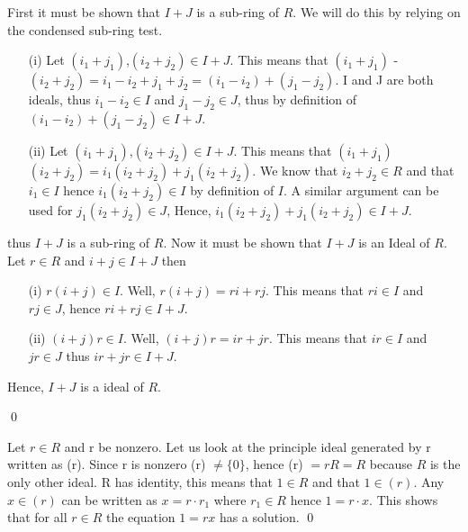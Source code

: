 \documentclass[11pt]{article}
\begin{document}

\affirmation


\proof
{
  First it must be shown that \(I+J\) is a sub-ring of \(R\). We will do this by relying on the condensed sub-ring test.
  \begin{itemize}
      \item[(i)] Let \((i_1 +j_1)\),\((i_2+j_2) \in I+J\). This means that \((i_1 +j_1)\) - \((i_2+j_2) = i_1 - i_2 + j_1 + j_2 = (i_1 - i_2) + (j_1 - j_2)\).
      I and J are both ideals, thus \(i_1 - i_2 \in I\) and \(j_1 - j_2 \in J\), thus by definition of \((i_1 - i_2) + (j_1 - j_2) \in I+J\).
      \item[(ii)] Let \((i_1 +j_1)\),\((i_2+j_2) \in I+J\). This means that \((i_1 +j_1)\)\((i_2+j_2) = i_1(i_2+j_2)+ j_1(i_2+j_2)\). We know that \(i_2+j_2 \in R\)  and that \(i_1 \in I\) hence \(i_1(i_2+j_2) \in I\) by definition of \(I\). A similar argument can be used for \(j_1(i_2+j_2) \in J\), Hence, \(i_1(i_2+j_2)+ j_1(i_2+j_2) \in I+J\).
  \end{itemize}
  thus \(I+J\) is a sub-ring of \(R.\) Now it must be shown that \(I + J\) is an Ideal of \(R\). Let \(r\in R\) and \(i+j \in I+J\) then
  \begin{itemize}
      \item[(i)]\(r(i+j) \in I\). Well, \(r(i+j) = ri + rj\). This means that \(ri \in I\) and \(rj \in J\), hence \(ri + rj \in I+J\).
      \item[(ii)]\((i+j)r \in I\). Well, \((i+j)r = ir + jr\). This means that \(ir \in I\) and \(jr \in J\) thus \(ir + jr \in I+J\).
  \end{itemize}
  Hence, \(I +J\) is a ideal of \(R\).
}

\qed


\proof
{
Let \(r \in R\) and r be nonzero. Let us look at the principle ideal generated by r written as (r). Since r is nonzero (r) \(\neq  \{0\}\), hence (r) \(= rR = R\) because \(R\) is the only other ideal. R has identity, this means that \(1 \in R\) and that \(1 \in (r)\). Any \(x \in (r)\) can be written as \(x= r \cdot r_1\) where \(r_1 \in R\) hence \(1= r\cdot x\). This shows that for all \(r\in R\) the equation \(1= rx\) has a solution.
}
\qed
\end{document}
